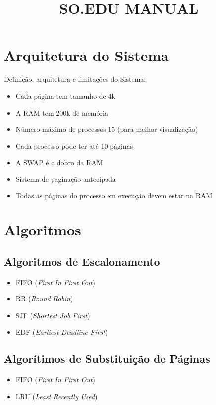 \documentclass{article}
\begin{document}
\title{SO.EDU MANUAL}

\maketitle

\section{Arquitetura do Sistema}
   Definição, arquitetura e limitações do Sistema:
   \begin{itemize}
	\item Cada página tem tamanho de 4k
  	\item A RAM tem 200k de memória
   	\item Número máximo de processos 15 (para melhor visualização)
   	\item Cada processo pode ter até 10 páginas
   	\item A SWAP é o dobro da RAM 
   	\item Sistema de paginação antecipada 
   	\item Todas as páginas do processo em execução devem estar na RAM
\end{itemize}

\section{Algoritmos}
\subsection{Algoritmos de Escalonamento}
\begin{itemize}
	\item FIFO (\textit{First In First Out})
	\item RR (\textit{Round Robin})
	\item SJF (\textit{Shortest Job First})
	\item EDF (\textit{Earliest Deadline First})
\end{itemize}

\subsection{Algorítimos de Substituição de Páginas}
\begin{itemize}
	\item FIFO (\textit{First In First Out})
	\item LRU (\textit{Least Recently Used})
\end{itemize}
\end{document}
